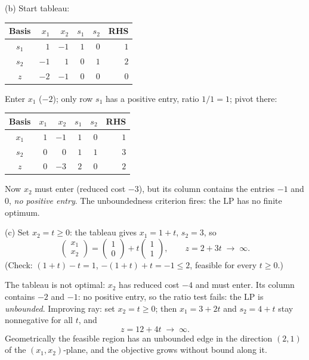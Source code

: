 \begin{solutions}
        (b) Start tableau:
        \begin{center}
        \begin{tabular}{c|rrrr|r}
        \hline
        Basis & $x_1$ & $x_2$ & $s_1$ & $s_2$ & RHS\\
        \hline
        $s_1$ & $1$ & $-1$ & $1$ & $0$ & $1$\\
        $s_2$ & $-1$ & $1$ & $0$ & $1$ & $2$\\
        \hline
        $z$ & $-2$ & $-1$ & $0$ & $0$ & $0$\\
        \hline
        \end{tabular}
        \end{center}
        Enter $x_1$ ($-2$); only row $s_1$ has a positive entry, ratio
        $1/1=1$; pivot there:
        \begin{center}
        \begin{tabular}{c|rrrr|r}
        \hline
        Basis & $x_1$ & $x_2$ & $s_1$ & $s_2$ & RHS\\
        \hline
        $x_1$ & $1$ & $-1$ & $1$ & $0$ & $1$\\
        $s_2$ & $0$ & $0$ & $1$ & $1$ & $3$\\
        \hline
        $z$ & $0$ & $-3$ & $2$ & $0$ & $2$\\
        \hline
        \end{tabular}
        \end{center}
        Now $x_2$ must enter (reduced cost $-3$), but its column contains
        the entries $-1$ and $0$, \emph{no positive entry}. The
        unboundedness criterion fires: the LP has no finite optimum.

        (c) Set $x_2=t\ge 0$: the tableau gives $x_1=1+t$, $s_2=3$, so
        \[
          \begin{pmatrix}x_1\\ x_2\end{pmatrix}
          =\begin{pmatrix}1\\ 0\end{pmatrix}
           +t\begin{pmatrix}1\\ 1\end{pmatrix},
          \qquad z=2+3t\;\longrightarrow\;\infty .
        \]
        (Check: $(1+t)-t=1$, $-(1+t)+t=-1\le 2$, feasible for every
        $t\ge 0$.)

  \item The tableau is not optimal: $x_2$ has reduced cost $-4$ and must
        enter. Its column contains $-2$ and $-1$: no positive entry, so
        the ratio test fails: the LP is \emph{unbounded}. Improving ray:
        set $x_2=t\ge 0$; then $x_1=3+2t$ and $s_2=4+t$ stay nonnegative
        for all $t$, and
        \[
          z=12+4t\;\longrightarrow\;\infty .
        \]
        Geometrically the feasible region has an unbounded edge in the
        direction $(2,1)$ of the $(x_1,x_2)$-plane, and the objective grows
        without bound along it.


\end{solutions}
